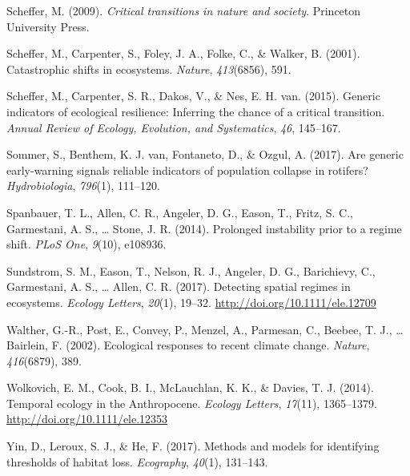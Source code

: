\documentclass[12pt,twoside,openany]{reedthesis}
\begin{document}
\leavevmode\hypertarget{ref-scheffer_critical_2009}{}%
Scheffer, M. (2009). \emph{Critical transitions in nature and society}. Princeton University Press.

\leavevmode\hypertarget{ref-scheffer_catastrophic_2001}{}%
Scheffer, M., Carpenter, S., Foley, J. A., Folke, C., \& Walker, B. (2001). Catastrophic shifts in ecosystems. \emph{Nature}, \emph{413}(6856), 591.

\leavevmode\hypertarget{ref-scheffer2015generic}{}%
Scheffer, M., Carpenter, S. R., Dakos, V., \& Nes, E. H. van. (2015). Generic indicators of ecological resilience: Inferring the chance of a critical transition. \emph{Annual Review of Ecology, Evolution, and Systematics}, \emph{46}, 145--167.

\leavevmode\hypertarget{ref-sommer2017generic}{}%
Sommer, S., Benthem, K. J. van, Fontaneto, D., \& Ozgul, A. (2017). Are generic early-warning signals reliable indicators of population collapse in rotifers? \emph{Hydrobiologia}, \emph{796}(1), 111--120.

\leavevmode\hypertarget{ref-spanbauer_prolonged_2014}{}%
Spanbauer, T. L., Allen, C. R., Angeler, D. G., Eason, T., Fritz, S. C., Garmestani, A. S., \ldots{} Stone, J. R. (2014). Prolonged instability prior to a regime shift. \emph{PLoS One}, \emph{9}(10), e108936.

\leavevmode\hypertarget{ref-sundstrom2017detecting}{}%
Sundstrom, S. M., Eason, T., Nelson, R. J., Angeler, D. G., Barichievy, C., Garmestani, A. S., \ldots{} Allen, C. R. (2017). Detecting spatial regimes in ecosystems. \emph{Ecology Letters}, \emph{20}(1), 19--32. \url{http://doi.org/10.1111/ele.12709}

\leavevmode\hypertarget{ref-walther_ecological_2002}{}%
Walther, G.-R., Post, E., Convey, P., Menzel, A., Parmesan, C., Beebee, T. J., \ldots{} Bairlein, F. (2002). Ecological responses to recent climate change. \emph{Nature}, \emph{416}(6879), 389.

\leavevmode\hypertarget{ref-wolkovich_temporal_2014}{}%
Wolkovich, E. M., Cook, B. I., McLauchlan, K. K., \& Davies, T. J. (2014). Temporal ecology in the Anthropocene. \emph{Ecology Letters}, \emph{17}(11), 1365--1379. \url{http://doi.org/10.1111/ele.12353}

\leavevmode\hypertarget{ref-yin2017methods}{}%
Yin, D., Leroux, S. J., \& He, F. (2017). Methods and models for identifying thresholds of habitat loss. \emph{Ecography}, \emph{40}(1), 131--143.
\end{document}

